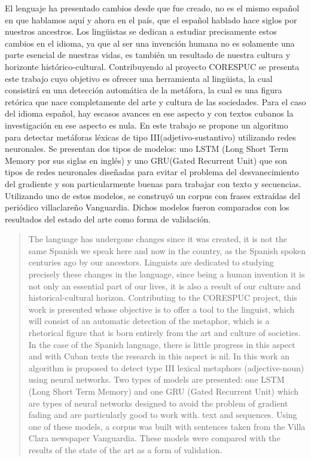 \begin{resumen}
El lenguaje ha presentado cambios desde que fue creado, no es el mismo español en que hablamos aquí y ahora en el país, que el español hablado hace siglos por nuestros ancestros. Los lingüistas se dedican a estudiar precisamente estos cambios en el idioma, ya que al ser una invención humana no es solamente una parte esencial de nuestras vidas, es también un resultado de nuestra cultura y horizonte histórico-cultural. Contribuyendo al proyecto CORESPUC se presenta este trabajo cuyo objetivo es ofrecer una herramienta al lingüista, la cual consistirá en una detección automática de la metáfora, la cual es una figura retórica que nace completamente del arte y cultura de las sociedades. Para el caso del idioma español, hay escasos avances en ese aspecto y con textos cubanos la investigación en ese aspecto es nula. En este trabajo se propone un algoritmo para detectar metáforas léxicas de tipo III(adjetivo-sustantivo) utilizando redes neuronales. Se presentan dos tipos de modelos: uno LSTM (Long Short Term Memory por sus siglas en inglés) y uno GRU(Gated Recurrent Unit) que son tipos de redes neuronales diseñadas para evitar el problema del desvanecimiento del gradiente y son particularmente buenas para trabajar con texto y secuencias. Utilizando uno de estos modelos, se construyó un corpus con frases extraídas del periódico villaclareño Vanguardia. Dichos modelos fueron comparados con los resultados del estado del arte como forma de validación.
\end{resumen}

\begin{abstract}
	The language has undergone changes since it was created, it is not the same Spanish we speak here and now in the country, as the Spanish spoken centuries ago by our ancestors. Linguists are dedicated to studying precisely these changes in the language, since being a human invention it is not only an essential part of our lives, it is also a result of our culture and historical-cultural horizon. Contributing to the CORESPUC project, this work is presented whose objective is to offer a tool to the linguist, which will consist of an automatic detection of the metaphor, which is a rhetorical figure that is born entirely from the art and culture of societies. In the case of the Spanish language, there is little progress in this aspect and with Cuban texts the research in this aspect is nil. In this work an algorithm is proposed to detect type III lexical metaphors (adjective-noun) using neural networks. Two types of models are presented: one LSTM (Long Short Term Memory) and one GRU (Gated Recurrent Unit) which are types of neural networks designed to avoid the problem of gradient fading and are particularly good to work with. text and sequences. Using one of these models, a corpus was built with sentences taken from the Villa Clara newspaper Vanguardia. These models were compared with the results of the state of the art as a form of validation.
\end{abstract}
